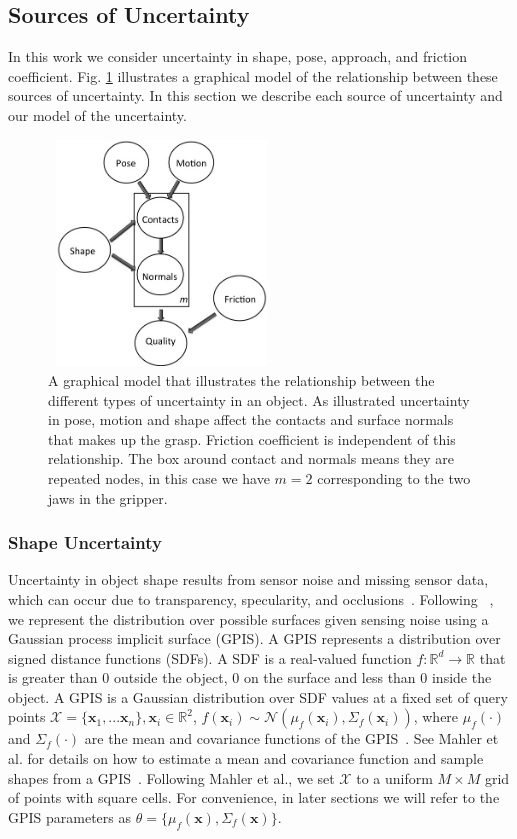 \documentclass[10pt, conference]{ieeeconf}      %
\newcommand{\bx}{\mathbf{x}}
\newcommand{\mX}{\mathcal{X}}
\newcommand{\mN}{\mathcal{N}}
\begin{document}
\subsection{Sources of Uncertainty}
In this work we consider uncertainty in shape, pose, approach, and friction coefficient.
Fig. \ref{fig:graphical_model} illustrates a graphical model of the relationship between these sources of uncertainty.
In this section we describe each source of uncertainty and our model of the uncertainty.

\begin{figure}[ht!]
\centering
\includegraphics[width = 6cm, height = 6cm]{figures/Graphical_Model.jpg}
\caption{A graphical model that illustrates the relationship between the different types of uncertainty in an object. As illustrated uncertainty in pose, motion and shape affect the contacts and surface normals that makes up the grasp. Friction coefficient is independent of this relationship. The box around contact and normals means they are repeated nodes, in this case we have $m=2$ corresponding to the two jaws in the gripper.  }
\vspace*{-10pt}
\label{fig:graphical_model}
\end{figure}

\subsubsection{Shape Uncertainty}

Uncertainty in object shape results from sensor noise and missing sensor data, which can occur due to transparency, specularity, and occlusions~\cite{mahler2015gp}.
Following ~\cite{mahler2015gp}, we represent the distribution over possible surfaces given sensing noise using a Gaussian process implicit surface (GPIS).
A GPIS represents a distribution over signed distance functions (SDFs).
A SDF is a real-valued function $f: \mathbb{R}^d \rightarrow \mathbb{R}$ that is greater than 0 outside the object, 0 on the surface and less than 0 inside the object.
A GPIS is a Gaussian distribution over SDF values at a fixed set of query points $\mX = \{\bx_1, ... \bx_n\}, \bx_i \in \mathbb{R}^2$, $f(\bx_i) \sim \mN(\mu_{f}(\bx_i),\Sigma_{f}(\bx_i))$, where $\mu_{f}(\cdot)$ and $\Sigma_{f}(\cdot)$ are the mean and covariance functions of the GPIS~\cite{rasmussen2006}.
See Mahler et al. for details on how to estimate a mean and covariance function and sample shapes from a GPIS~\cite{mahler2015gp}.
Following Mahler et al., we set $\mX$ to a uniform $M \times M$ grid of points with square cells.
For convenience, in later sections we will refer to the GPIS parameters as $\theta = \lbrace \mu_{f}(\bx), \Sigma_{f}(\bx) \rbrace$. 
\end{document}
